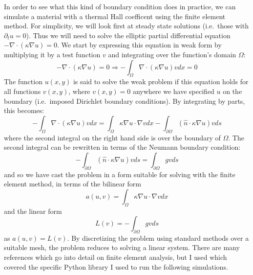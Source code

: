 \documentclass{thesis-umich}
\begin{document}
In order to see what this kind of boundary condition does in practice,
we can simulate a material with a thermal Hall coefficent using the
finite element method. For simplicity, we will look first at steady
state solutions (i.e.~those with \(\partial_t u = 0\)). Thus we will
need to solve the elliptic partial differential equation
\(-\nabla \cdot (\kappa \nabla u) = 0\). We start by expressing this
equation in weak form by multiplying it by a test function \(v\) and
integrating over the function's domain \(\Omega\):
\[ -\nabla \cdot (\kappa \nabla u) = 0 \Rightarrow -\int_\Omega \nabla \cdot
(\kappa \nabla u) v dx = 0 \] The function \(u(x,y)\) is said to solve
the weak problem if this equation holds for all functions \(v(x,y)\),
where \(v(x, y) = 0\) anywhere we have specified \(u\) on the boundary
(i.e.~imposed Dirichlet boundary conditions). By integrating by parts,
this becomes:
\[ - \int_\Omega \nabla \cdot (\kappa \nabla u) v dx = \int_\Omega \kappa \nabla
u \cdot \nabla v dx - \int_{\partial \Omega} (\hat{n} \cdot \kappa\nabla u) v ds\]
where the second integral on the right hand side is over the boundary of
\(\Omega\). The second integral can be rewritten in terms of the Neumann
boundary condition:
\[ - \int_{\partial\Omega} (\hat{n} \cdot \kappa \nabla u) v ds =
\int_{\partial\Omega} g v ds\] and so we have cast the problem in a form
suitable for solving with the finite element method, in terms of the
bilinear form
\[ a(u, v) = \int_\Omega \kappa \nabla u \cdot \nabla v dx \] and the
linear form \[ L(v) = -\int_{\partial \Omega} g v ds \] as
\(a(u, v) = L(v)\). By discretizing the problem using standard methods
over a suitable mesh, the problem reduces to solving a linear system.
There are many references which go into detail on finite element
analysis, but I used \cite{LangtangenLogg2017} which covered the
specific Python library I used to run the following simulations.
\end{document}
